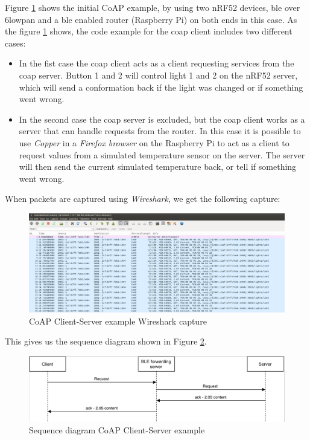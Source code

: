 Figure \ref{fig:CoAPexample1} shows the initial CoAP example, by using two nRF52 devices, \gls{ble} over \gls{6lowpan} and a \gls{ble} enabled router (Raspberry Pi) on both ends in this case. As the figure \ref{fig:CoAPexample1} shows, the code example for the \gls{coap} client includes two different cases: 

\begin{itemize}
  \item In the fist case the \gls{coap} client acts as a client requesting services from the \gls{coap} server. Button 1 and 2 will control light 1 and 2 on the nRF52 server, which will send a conformation back if the light was changed or if something went wrong.
  \item In the second case the \gls{coap} server is excluded, but the \gls{coap} client works as a server that can handle requests from the router. In this case it is possible to use \textit{Copper} in a \textit{Firefox browser} on the Raspberry Pi to act as a client to request values from a simulated temperature sensor on the server. The server will  then send the current simulated temperature back, or tell if something went wrong. 
\end{itemize} 

When packets are captured using \textit{Wireshark}, we get the following capture: 

\begin{figure}[h]
    \centering
    \includegraphics[scale=0.27]{CoapEx1captureCropped2.png}    
    \caption{CoAP Client-Server example Wireshark capture}
    \label{fig:CoAPexample1}
\end{figure}


This gives us the sequence diagram shown in Figure \ref{fig:seq1}. 

\begin{figure}[h]
    \centering
    \includegraphics[scale=0.27]{seq1.png}    
    \caption{Sequence diagram CoAP Client-Server example}
    \label{fig:seq1}
\end{figure}

